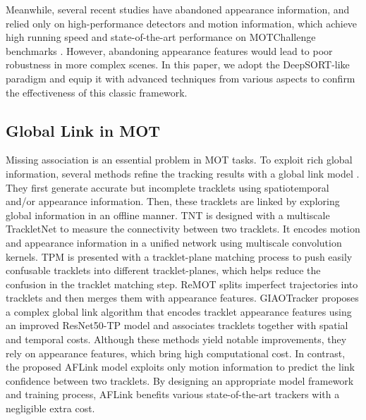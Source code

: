 \documentclass[lettersize,journal]{IEEEtran}
\begin{document}
Meanwhile, several recent studies \cite{stadler2021performance, stadler2022modelling, zhang2022bytetrack, cao2022observation} 
have abandoned appearance information, and relied only on high-performance detectors and motion information, 
which achieve high running speed and state-of-the-art performance on MOTChallenge benchmarks \cite{milan2016mot16, dendorfer2020mot20}.
However, abandoning appearance features would lead to poor robustness in more complex scenes.
In this paper, we adopt the DeepSORT-like \cite{wojke2017simple} paradigm and equip it with advanced techniques from various aspects
to confirm the effectiveness of this classic framework.

\subsection{Global Link in MOT}

Missing association is an essential problem in MOT tasks.
To exploit rich global information, several methods refine the tracking results with a global link model
\cite{du2021giaotracker, wang2016tracklet, wang2019exploit, peng2020tpm, yang2021remot}.
They first generate accurate but incomplete tracklets using spatiotemporal and/or appearance information.
Then, these tracklets are linked by exploring global information in an offline manner.
TNT \cite{wang2019exploit} is designed with a multiscale TrackletNet to measure the connectivity between two tracklets.
It encodes motion and appearance information in a unified network using multiscale convolution kernels.
TPM \cite{peng2020tpm} is presented with a tracklet-plane matching process to push easily confusable tracklets into different tracklet-planes,
which helps reduce the confusion in the tracklet matching step.
ReMOT \cite{yang2021remot} splits imperfect trajectories into tracklets and then merges them with appearance features.
GIAOTracker \cite{du2021giaotracker} proposes a complex global link algorithm 
that encodes tracklet appearance features using an improved ResNet50-TP model \cite{gao2018revisiting} 
and associates tracklets together with spatial and temporal costs.
Although these methods yield notable improvements, they rely on appearance features, which bring high computational cost.
In contrast, the proposed AFLink model exploits only motion information to predict the link confidence between two tracklets.
By designing an appropriate model framework and training process, AFLink benefits various state-of-the-art trackers with a negligible extra cost.
\end{document}
